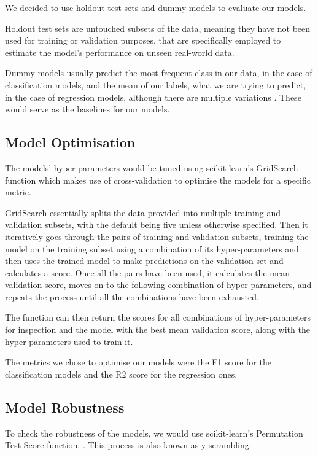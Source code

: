 We decided to use holdout test sets and dummy models to evaluate our models.

Holdout test sets are untouched subsets of the data, meaning they have not been used for training or validation purposes,  that are specifically employed to estimate the model's performance on unseen real-world data.

Dummy models usually predict the most frequent class in our data, in the case of classification models, and the mean of our labels, what we are trying to predict, in the case of regression models, although there are multiple variations \citep{DummyClassifier, DummyRegressor}. These would serve as the baselines for our models.

\subsection{Model Optimisation}
\label{subsec:Model_Optimisation}

The models' hyper-parameters would be tuned using scikit-learn's GridSearch function \citep{GridSearch} which makes use of cross-validation to optimise the models for a specific metric. 

GridSearch essentially splits the data provided into multiple training and validation subsets, with the default being five unless otherwise specified. Then it iteratively goes through the pairs of training and validation subsets, training the model on the training subset using a combination of its hyper-parameters and then uses the trained model to make predictions on the validation set and calculates a score. Once all the pairs have been used, it calculates the mean validation score, moves on to the following combination of hyper-parameters, and repeats the process until all the combinations have been exhausted.

The function can then return the scores for all combinations of hyper-parameters for inspection and the model with the best mean validation score, along with the hyper-parameters used to train it.

The metrics we chose to optimise our models were the F1 score for the classification models and the R2 score for the regression ones.

\subsection{Model Robustness}
\label{subsec:Robustness}

To check the robustness of the models, we would use scikit-learn's Permutation Test Score function. \citep{Permutation_Test_Score}. This process is also known as y-scrambling.

